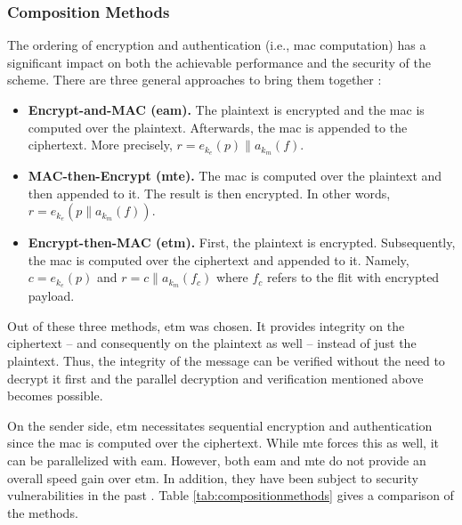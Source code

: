 \subsubsection{Composition Methods}
The ordering of encryption and authentication (i.e., \gls{mac} computation) has a significant impact on both the achievable performance and the
security of the scheme. There are three general approaches to bring them together \cite{bellare00authenc}:
\begin{itemize}
    \item \textbf{Encrypt-and-MAC (\gls{eam}).} The plaintext is encrypted and the \gls{mac} is computed over the plaintext. Afterwards, the \gls{mac} is
        appended to the ciphertext. More precisely, $r = e_{k_e}(p)\|a_{k_m}(f)$.
    \item \textbf{MAC-then-Encrypt (\gls{mte}).} The \gls{mac} is computed over the plaintext and then appended to it. The result is then
        encrypted. In other words, $r = e_{k_e}(p\|a_{k_m}(f))$.
    \item \textbf{Encrypt-then-MAC (\gls{etm}).} First, the plaintext is encrypted. Subsequently, the \gls{mac} is computed over the ciphertext and appended to it.
        Namely, $c = e_{k_e}(p)$ and $r = c\|a_{k_m}(f_c)$ where $f_c$ refers to the flit with encrypted payload.
\end{itemize}
\vspace{0.5\baselineskip}

Out of these three methods, \gls{etm} was chosen. It provides integrity on the ciphertext -- and consequently on the plaintext as well --
instead of just the plaintext. Thus, the integrity of the message can be verified without the need to decrypt it first and the parallel decryption and
verification mentioned above becomes possible.

On the sender side, \gls{etm} necessitates sequential encryption and authentication since the \gls{mac} is computed over the ciphertext. While
\gls{mte} forces this as well, it can be parallelized with \gls{eam}. However, both \gls{eam} and \gls{mte} do not provide an overall speed gain over
\gls{etm}. In addition, they have been subject to security vulnerabilities in the past \cites{bellare00authenc}{bellare04ssheam}{etmtls}. Table
\ref{tab:compositionmethods} gives a comparison of the methods.

